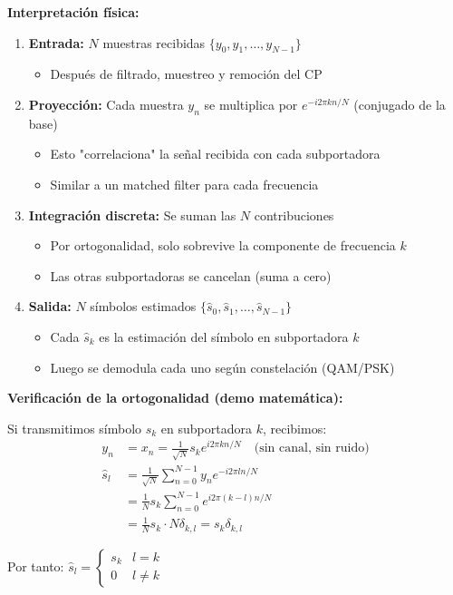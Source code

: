 \documentclass[10pt,a4paper]{article}
\begin{document}
\textbf{Interpretación física:}
\begin{enumerate}
\item \textbf{Entrada:} $N$ muestras recibidas $\{y_0, y_1, \ldots, y_{N-1}\}$
  \begin{itemize}
  \item Después de filtrado, muestreo y remoción del CP
  \end{itemize}
\item \textbf{Proyección:} Cada muestra $y_n$ se multiplica por $e^{-i2\pi kn/N}$ (conjugado de la base)
  \begin{itemize}
  \item Esto "correlaciona" la señal recibida con cada subportadora
  \item Similar a un matched filter para cada frecuencia
  \end{itemize}
\item \textbf{Integración discreta:} Se suman las $N$ contribuciones
  \begin{itemize}
  \item Por ortogonalidad, solo sobrevive la componente de frecuencia $k$
  \item Las otras subportadoras se cancelan (suma a cero)
  \end{itemize}
\item \textbf{Salida:} $N$ símbolos estimados $\{\hat{s}_0, \hat{s}_1, \ldots, \hat{s}_{N-1}\}$
  \begin{itemize}
  \item Cada $\hat{s}_k$ es la estimación del símbolo en subportadora $k$
  \item Luego se demodula cada uno según constelación (QAM/PSK)
  \end{itemize}
\end{enumerate}

\textbf{Verificación de la ortogonalidad (demo matemática):}

Si transmitimos símbolo $s_k$ en subportadora $k$, recibimos:
\begin{align*}
y_n &= x_n = \frac{1}{\sqrt{N}} s_k e^{i2\pi kn/N} \quad \text{(sin canal, sin ruido)}\\
\hat{s}_l &= \frac{1}{\sqrt{N}}\sum_{n=0}^{N-1} y_n e^{-i2\pi ln/N}\\
&= \frac{1}{N} s_k \sum_{n=0}^{N-1} e^{i2\pi (k-l)n/N}\\
&= \frac{1}{N} s_k \cdot N\delta_{k,l} = s_k \delta_{k,l}
\end{align*}

Por tanto: $\hat{s}_l = \begin{cases} s_k & l=k\\ 0 & l \neq k \end{cases}$
\end{document}
